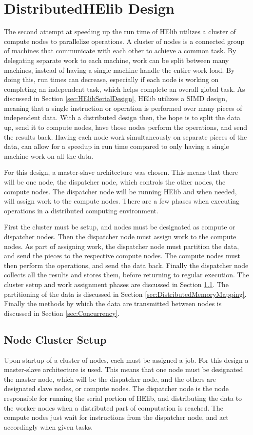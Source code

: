 \chapter{DistributedHElib Design} \label{chap:DistributedHElibDesign}
The second attempt at speeding up the run time of HElib utilizes a cluster of compute nodes to parallelize operations. A cluster of nodes is a connected group of machines that communicate with each other to achieve a common task. By delegating separate work to each machine, work can be split between many machines, instead of having a single machine handle the entire work load. By doing this, run times can decrease, especially if each node is working on completing an independent task, which helps complete an overall global task. As discussed in Section \ref{sec:HElibSerialDesign}, HElib utilizes a SIMD design, meaning that a single instruction or operation is performed over many pieces of independent data. With a distributed design then, the hope is to split the data up, send it to compute nodes, have those nodes perform the operations, and send the results back. Having each node work simultaneously on separate pieces of the data, can allow for a speedup in run time compared to only having a single machine work on all the data.

For this design, a master-slave architecture was chosen. This means that there will be one node, the dispatcher node, which controls the other nodes, the compute nodes. The dispatcher node will be running HElib and when needed, will assign work to the compute nodes. There are a few phases when executing operations in a distributed computing environment.

First the cluster must be setup, and nodes must be designated as compute or dispatcher nodes. Then the dispatcher node must assign work to the compute nodes. As part of assigning work, the dispatcher node must partition the data, and send the pieces to the respective compute nodes. The compute nodes must then perform the operations, and send the data back. Finally the dispatcher node collects all the results and stores them, before returning to regular execution. The cluster setup and work assignment phases are discussed in Section \ref{sec:NodeClusterSetup}. The partitioning of the data is discussed in Section \ref{sec:DistributedMemoryMapping}. Finally the methods by which the data are transmitted between nodes is discussed in Section \ref{sec:Concurrency}.
 
\section{Node Cluster Setup} \label{sec:NodeClusterSetup}
Upon startup of a cluster of nodes, each must be assigned a job. For this design a master-slave architecture is used. This means that one node must be designated the master node, which will be the dispatcher node, and the others are designated slave nodes, or compute nodes. The dispatcher node is the node responsible for running the serial portion of HElib, and distributing the data to the worker nodes when a distributed part of computation is reached. The compute nodes just wait for instructions from the dispatcher node, and act accordingly when given tasks.

